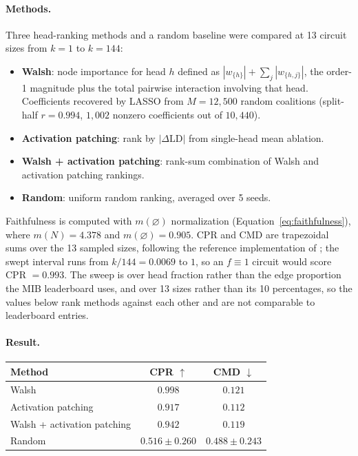 \documentclass{article}
\begin{document}
\paragraph{Methods.}

Three head-ranking methods and a random baseline were compared at 13
circuit sizes from $k = 1$ to $k = 144$:

\begin{itemize}
\item \textbf{Walsh}: node importance for head $h$ defined as
  $|w_{\{h\}}| + \sum_j |w_{\{h,j\}}|$, the order-1 magnitude plus
  the total pairwise interaction involving that head. Coefficients
  recovered by LASSO from $M = 12{,}500$ random coalitions
  (split-half $r = 0.994$, $1{,}002$ nonzero coefficients out of
  $10{,}440$).
\item \textbf{Activation patching}: rank by $|\Delta\text{LD}|$ from
  single-head mean ablation.
\item \textbf{Walsh + activation patching}: rank-sum combination of
  Walsh and activation patching rankings.
\item \textbf{Random}: uniform random ranking, averaged over 5 seeds.
\end{itemize}

Faithfulness is computed with $m(\varnothing)$ normalization
(Equation~\ref{eq:faithfulness}), where $m(N) = 4.378$ and
$m(\varnothing) = 0.905$. CPR and CMD are trapezoidal sums over the 13
sampled sizes, following the reference implementation of
\citet{mueller2025mib}; the swept interval runs from $k/144 = 0.0069$ to
$1$, so an $f \equiv 1$ circuit would score CPR $= 0.993$. The sweep is
over head fraction rather than the edge proportion the MIB leaderboard
uses, and over 13 sizes rather than its 10 percentages, so the values
below rank methods against each other and are not comparable to
leaderboard entries.

\paragraph{Result.}

\medskip

\begin{tabular}{lcc}
\toprule
Method & CPR $\uparrow$ & CMD $\downarrow$ \\
\midrule
Walsh                              & $0.998$ & $0.121$ \\
Activation patching                & $0.917$ & $0.112$ \\
Walsh + activation patching        & $0.942$ & $0.119$ \\
Random                             & $0.516 \pm 0.260$ & $0.488 \pm 0.243$ \\
\bottomrule
\end{tabular}
\end{document}
